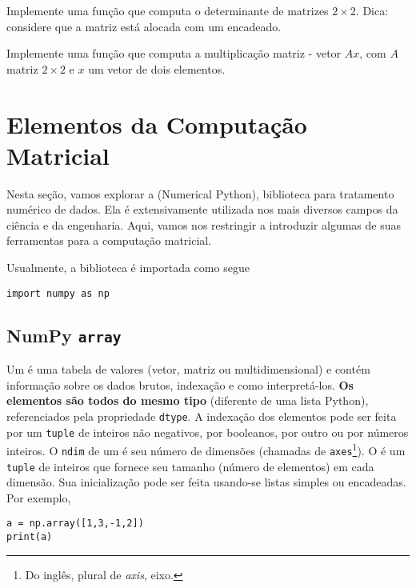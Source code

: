\documentclass[a4paper,10pt,twoside]{article}
\begin{document}
\begin{exr}
  Implemente uma função que computa o determinante de matrizes $2\times 2$. Dica: considere que a matriz está alocada com um {\PYTHONlist} encadeado.
\end{exr}

\begin{exr}
  Implemente uma função que computa a multiplicação matriz - vetor $Ax$, com $A$ matriz $2\times 2$ e $x$ um vetor de dois elementos.
\end{exr}


\section{Elementos da Computação Matricial}\label{sec_mat}

Nesta seção, vamos explorar a {\numpy} (Numerical Python), biblioteca para tratamento numérico de dados. Ela é extensivamente utilizada nos mais diversos campos da ciência e da engenharia. Aqui, vamos nos restringir a introduzir algumas de suas ferramentas para a computação matricial.

Usualmente, a biblioteca é importada como segue

\begin{lstlisting}
import numpy as np
\end{lstlisting}

\subsection{NumPy \texttt{array}}

Um {\PYTHONnumpyDOTarray} é uma tabela de valores (vetor, matriz ou multidimensional) e contém informação sobre os dados brutos, indexação e como interpretá-los. {\bf Os elementos são todos do mesmo tipo} (diferente de uma lista Python), referenciados pela propriedade \texttt{dtype}. A indexação dos elementos pode ser feita por um \texttt{tuple} de inteiros não negativos, por booleanos, por outro {\PYTHONnumpyDOTarray} ou por números inteiros. O \texttt{ndim} de um {\PYTHONnumpyDOTarray} é seu número de dimensões (chamadas de \texttt{axes}\footnote{Do inglês, plural de {\it axis}, eixo.}). O {\PYTHONnumpyDOTndarrayDOTshape} é um \texttt{tuple} de inteiros que fornece seu tamanho (número de elementos) em cada dimensão. Sua inicialização pode ser feita usando-se listas simples ou encadeadas. Por exemplo,

\begin{lstlisting}
a = np.array([1,3,-1,2])
print(a)
\end{lstlisting}
\end{document}
